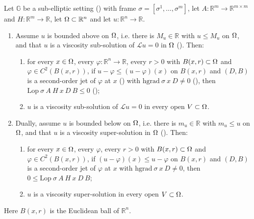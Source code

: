\begin{theorem}
Let $\mathbb G$ be a sub-elliptic setting () with frame
$\sigma=[\sigma^1,\ldots,\sigma^m]$, let
$A:\mathbb R^{m}\to\mathbb R^{m\times m}$ and $H:\mathbb R^{m}\to\mathbb R$, let
$\Omega\subset\mathbb R^{n}$ and let $u:\mathbb R^{n}\to\mathbb R$.
\begin{enumerate}
\item Assume $u$ is bounded above on $\Omega$, i.e. there is $M_u\in\mathbb R$ with
  $u\le M_u$ on $\Omega$, and that $u$ is a viscosity sub-solution of $\mathcal L u=0$ in
  $\Omega$ (). Then:
  \begin{enumerate}
  \item for every $x\in\Omega$, every $\varphi:\mathbb R^{n}\to\mathbb R$, every $r>0$ with
    $B(x,r)\subset\Omega$ and $\varphi\in C^{2}(B(x,r))$, if
    $u-\varphi\le (u-\varphi)(x)$ on $B(x,r)$ and $(D,B)$ is a second-order jet of
    $\varphi$ at $x$ () with
    $\mathrm{hgrad}\ \sigma\ x\ D\ne0$ (), then
    $\mathrm{Lop}\ \sigma\ A\ H\ x\ D\ B\le0$ ();
  \item $u$ is a viscosity sub-solution of $\mathcal L u=0$ in every open
    $V\subset\Omega$.
  \end{enumerate}
\item Dually, assume $u$ is bounded below on $\Omega$, i.e. there is $m_u\in\mathbb R$ with
  $m_u\le u$ on $\Omega$, and that $u$ is a viscosity super-solution in $\Omega$
  (). Then:
  \begin{enumerate}
  \item for every $x\in\Omega$, every $\varphi$, every $r>0$ with $B(x,r)\subset\Omega$ and
    $\varphi\in C^{2}(B(x,r))$, if $(u-\varphi)(x)\le u-\varphi$ on $B(x,r)$ and $(D,B)$
    is a second-order jet of $\varphi$ at $x$ with
    $\mathrm{hgrad}\ \sigma\ x\ D\ne0$, then
    $0\le\mathrm{Lop}\ \sigma\ A\ H\ x\ D\ B$;
  \item $u$ is a viscosity super-solution in every open $V\subset\Omega$.
  \end{enumerate}
\end{enumerate}
Here $B(x,r)$ is the Euclidean ball of $\mathbb R^{n}$.
\end{theorem}
